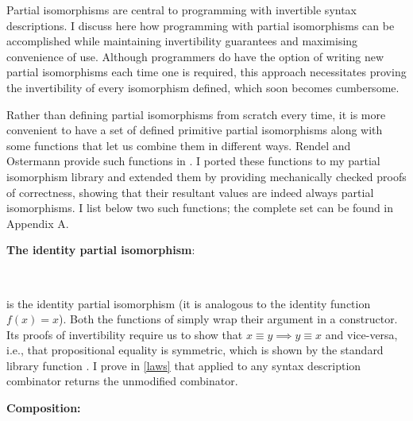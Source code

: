 \documentclass[12pt,a4paper,twoside,openright]{report}
\newcommand{\C}{\AgdaInductiveConstructor}
\newcommand{\F}{\AgdaFunction}
\begin{document}
Partial isomorphisms are central to programming with invertible syntax descriptions. I discuss here how programming with partial isomorphisms can be accomplished while maintaining invertibility guarantees and maximising convenience of use. Although programmers do have the option of writing new partial isomorphisms each time one is required, this approach necessitates proving the invertibility of every isomorphism defined, which soon becomes cumbersome.

Rather than defining partial isomorphisms from scratch every time, it is more convenient to have a set of defined primitive partial isomorphisms along with some functions that let us combine them in different ways. Rendel and Ostermann provide such functions in \cite{invert}.  
I ported these functions to my partial isomorphism library and extended them by providing mechanically checked proofs of correctness, showing that their resultant values are indeed always partial isomorphisms. I list below two such functions; the complete set can be found in Appendix A.

{\bf The identity partial isomorphism}:

\begin{code}
\> \AgdaSymbol{:} \AgdaSymbol{\{} \AgdaSymbol{:} \AgdaSymbol{\}}    \<%
\\
\> \AgdaSymbol{=}  \AgdaInductiveConstructor{,}         \AgdaSymbol{)} \AgdaInductiveConstructor{,}       \AgdaSymbol{)} \<%
\end{code}
\F{id} is the identity partial isomorphism (it is analogous to the identity function $f(x) = x$). Both the functions of \F{id} simply wrap their argument in a \C{just} constructor. Its proofs of invertibility require us to show that $x \equiv y \implies y \equiv x$ and vice-versa, i.e., that propositional equality is symmetric, which is shown by the standard library function \F{sym}.  
I prove in \autoref{laws} that \F{id} applied to any syntax description combinator returns the unmodified combinator.

{\bf Composition:}
\end{document}

